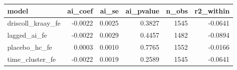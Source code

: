 \begin{tabular}{lrrrrr}
\hline
model & ai\_coef & ai\_se & ai\_pvalue & n\_obs & r2\_within \\
\hline
driscoll\_kraay\_fe & -0.0022 & 0.0025 & 0.3827 & 1545 & -0.0641 \\
lagged\_ai\_fe & -0.0022 & 0.0029 & 0.4457 & 1482 & -0.0894 \\
placebo\_hc\_fe & 0.0003 & 0.0010 & 0.7765 & 1552 & -0.0166 \\
time\_cluster\_fe & -0.0022 & 0.0019 & 0.2589 & 1545 & -0.0641 \\
\hline
\end{tabular}